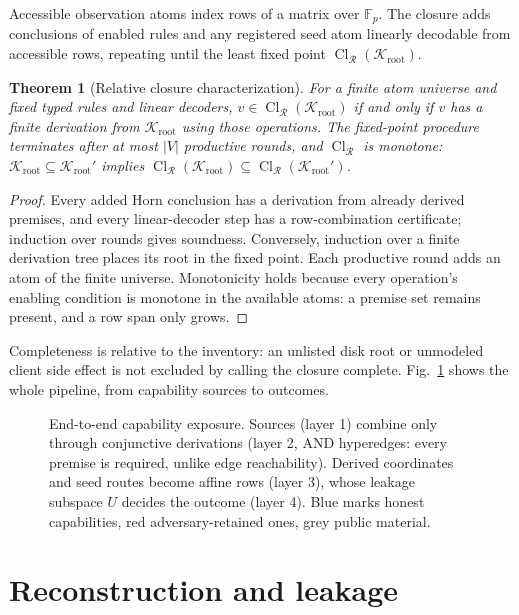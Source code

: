 \documentclass[pdflatex,sn-mathphys-num]{sn-jnl}%
\theoremstyle{plain}
\newtheorem{theorem}{Theorem}
\theoremstyle{definition}
\newcommand{\Cl}{\operatorname{Cl}}
\newcommand{\F}{\mathbb{F}}
\begin{document}
Accessible observation atoms index rows of a matrix over $\F_p$. The closure adds conclusions of enabled rules and any registered seed atom linearly decodable from accessible rows, repeating until the least fixed point $\Cl_{\mathcal R}(\mathcal K_{\mathrm{root}})$.

\begin{theorem}[Relative closure characterization]\label{thm:closure}
For a finite atom universe and fixed typed rules and linear decoders, $v\in\Cl_{\mathcal R}(\mathcal K_{\mathrm{root}})$ if and only if $v$ has a finite derivation from $\mathcal K_{\mathrm{root}}$ using those operations. The fixed-point procedure terminates after at most $|V|$ productive rounds, and $\Cl_{\mathcal R}$ is monotone: $\mathcal K_{\mathrm{root}}\subseteq \mathcal K_{\mathrm{root}}'$ implies $\Cl_{\mathcal R}(\mathcal K_{\mathrm{root}})\subseteq\Cl_{\mathcal R}(\mathcal K_{\mathrm{root}}')$.
\end{theorem}
\begin{proof}
Every added Horn conclusion has a derivation from already derived premises, and every linear-decoder step has a row-combination certificate; induction over rounds gives soundness. Conversely, induction over a finite derivation tree places its root in the fixed point. Each productive round adds an atom of the finite universe. Monotonicity holds because every operation's enabling condition is monotone in the available atoms: a premise set remains present, and a row span only grows.
\end{proof}

Completeness is relative to the inventory: an unlisted disk root or unmodeled client side effect is not excluded by calling the closure complete. Fig.~\ref{fig:capabilities} shows the whole pipeline, from capability sources to outcomes.

\begin{figure}[t]
\centering
\figbox{}
\caption{End-to-end capability exposure. Sources (layer 1) combine only through conjunctive derivations (layer 2, AND hyperedges: every premise is required, unlike edge reachability). Derived coordinates and seed routes become affine rows (layer 3), whose leakage subspace $U$ decides the outcome (layer 4). Blue marks honest capabilities, red adversary-retained ones, grey public material.}\label{fig:capabilities}
\end{figure}


\section{Reconstruction and leakage}\label{sec:leakage}
\end{document}
